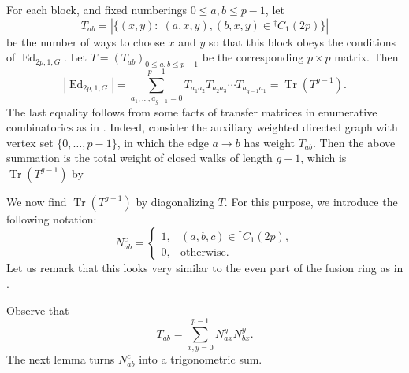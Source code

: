 \documentclass[11pt]{amsart}
\newcommand{\Ed}{\operatorname{Ed}}
\begin{document}
For each block, and fixed numberings $0\leq a,b\leq p-1$, let
\[
T_{ab}=|\{(x,y):\; (a,x,y),(b,x,y)\in {}^\dagger C_1(2p)\}|
\]
be the number of ways to choose $x$ and $y$ so that this block obeys the conditions of $\Ed_{2p,1,G}$.  
Let $T=(T_{ab})_{0\leq a,b\leq p-1}$
be the corresponding $p\times p$ matrix.  Then
\begin{equation}\label{eqn: trace}
    |\Ed_{2p,1,G}|
=
\sum_{a_1,\ldots,a_{g-1}=0}^{p-1}
T_{a_1a_2}T_{a_2a_3}\cdots T_{a_{g-1}a_1}
=
\operatorname{Tr}(T^{g-1}).
\end{equation}
The last equality follows from some facts of transfer matrices in enumerative combinatorics as in \cite[\S4.7.1]{StanleyEC1}.  Indeed, consider
the auxiliary weighted directed graph with vertex set $\{0,\ldots,p-1\}$, in
which the edge $a\to b$ has weight $T_{ab}$.  Then the above summation is
the total weight of closed walks of length $g-1$, which is
$\operatorname{Tr}(T^{g-1})$ by \cite[first line of the proof of Corollary 4.7.3]{StanleyEC1}

We now find $\operatorname{Tr}(T^{g-1})$ by diagonalizing $T$.
For this purpose, we introduce the following notation:
\[
    N_{ab}^{c}=
    \begin{cases}
    1,& (a,b,c)\in{}^\dagger C_1(2p),\\
    0,& \text{otherwise}.
    \end{cases}
\]
Let us remark that this looks very similar to the even part of the fusion ring as in \cite[(1.1)]{RunkelSuszek}. 

Observe that 
\begin{equation}\label{eqn: tnn}
    T_{ab}=\sum_{x,y=0}^{p-1}N_{ax}^y N_{bx}^y.
\end{equation}
The next lemma turns $N_{ab}^c$ into a trigonometric sum.
\end{document}
